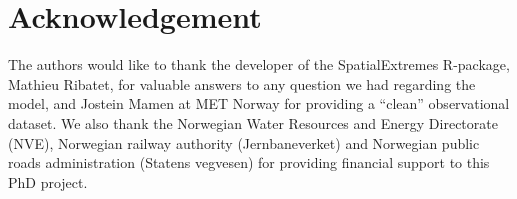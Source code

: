 \documentclass[12pt,a4paper,english]{article}
\begin{document}
\section{Acknowledgement}

The authors would like to thank the developer of the SpatialExtremes R-package, Mathieu Ribatet, for valuable answers to any question we had regarding the model, and Jostein Mamen at MET Norway for providing a ``clean'' observational dataset.
We also thank the Norwegian Water Resources and Energy Directorate (NVE), Norwegian railway authority (Jernbaneverket) and Norwegian public roads administration (Statens vegvesen) for providing financial support to this PhD project. 



\end{document}
